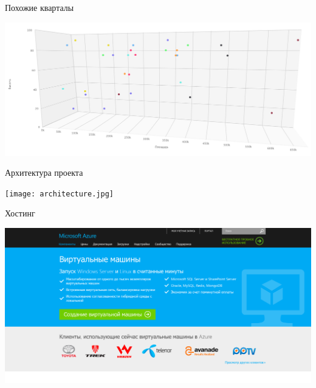 \documentclass[14pt, fleqn, xcolor={dvipsnames, table}]{beamer}
\begin{document}
        \begin{frame}{Похожие кварталы}
            \begin{center}
                \includegraphics[scale=0.27]{nn.png}
            \end{center}
        \end{frame}
        
        \begin{frame}{Архитектура проекта}
            \begin{center}
                \texttt{[image: architecture.jpg]}
            \end{center}
        \end{frame}
        
        \begin{frame}{Хостинг}
            \begin{center}
                \includegraphics[scale=0.25]{azure.png}
            \end{center}
        \end{frame}
        
\end{document}
